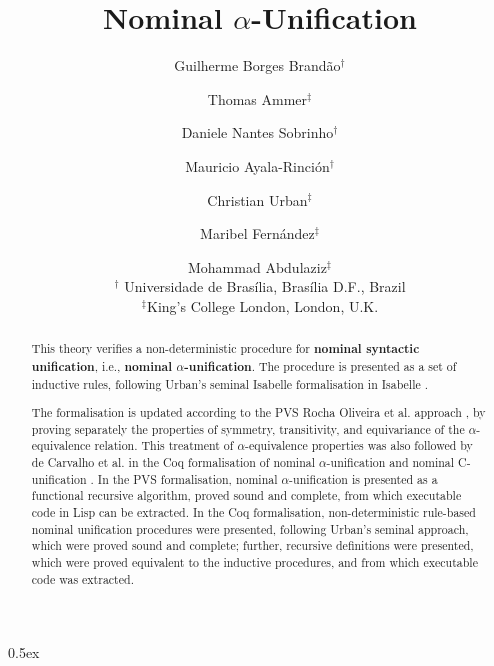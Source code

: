 \documentclass[11pt,a4paper]{article}
\begin{document}
\title{Nominal $\alpha$-Unification}
\author{Guilherme Borges Brand\~ao$^\dag$ \and Thomas Ammer$^\ddag$ \and Daniele Nantes Sobrinho$^\dag$ \and Mauricio Ayala-Rinci\'on$^\dag$ \and  Christian Urban$^\ddag$ \and Maribel Fern\'andez$^\ddag$ \and Mohammad Abdulaziz$^\ddag$\\[2mm]
\mbox{}$^\dag$ Universidade de Bras\'ilia, Bras\'ilia D.F., Brazil \\[1mm]
\mbox{}$^\ddag$King's College London, London, U.K.
 }

\maketitle

\begin{abstract}
This theory verifies a non-deterministic procedure for \textbf{nominal syntactic unification}, i.e., \textbf{nominal $\alpha$-unification}. The procedure is presented as a set of inductive rules, following Urban's seminal Isabelle formalisation in Isabelle \cite{DBLP:journals/tcs/UrbanPG04,DBLP:journals/corr/abs-1012-4890}. 

The formalisation is updated according to the PVS Rocha Oliveira et al. approach \cite{DBLP:journals/entcs/Ayala-RinconFO16,ACRochaOliveira2016}, by proving separately the properties of symmetry, transitivity, and equivariance of the $\alpha$-equivalence relation. This treatment of $\alpha$-equivalence properties was also followed by de Carvalho et al. in the Coq formalisation of nominal $\alpha$-unification and nominal C-unification \cite{DBLP:journals/tcs/Ayala-RinconSFN19,WLRdeCarvalho2019}. In the PVS formalisation, nominal $\alpha$-unification is presented as a functional recursive algorithm, proved sound and complete, from which executable code in Lisp can be extracted. In the Coq formalisation, non-deterministic rule-based nominal unification procedures were presented, following Urban's seminal approach, which were proved sound and complete; further, recursive definitions were presented, which were proved equivalent to the inductive procedures, and from which executable code was extracted. 

\end{abstract}
\tableofcontents

\parindent 0pt\parskip 0.5ex








%
\end{document}
